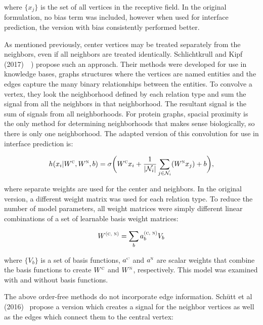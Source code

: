 \noindent
where $\{x_j\}$ is the set of all vertices in the receptive field.
In the original formulation, no bias term was included, however when used for interface prediction, the version with bias consistently performed better.

As mentioned previously, center vertices may be treated separately from the neighbors, even if all neighbors are treated identically. 
Schlichtkrull and Kipf (2017)~~\cite{schlichtkrull2017}) propose such an approach.
Their methods were developed for use in knowledge bases, graphs structures where the vertices are named entities and the edges capture the many binary relationships between the entities. 
To convolve a vertex, they look the neighborhood defined by each relation type and sum the signal from all the neighbors in that neighborhood.
The resultant signal is the sum of signals from all neighborhoods.
For protein graphs, spacial proximity is the only method for determining neighborhoods that makes sense biologically, so there is only one neighborhood.
The adapted version of this convolution for use in interface prediction is:

\begin{equation}
h(x_i | W^\textsc{c}, W^\textsc{n}, b)= \sigma \bigg( W^\textsc{c} x_i + \frac{1}{|\mathcal{N}_i|} \sum_{j \in \mathcal{N}_i}(W^\textsc{n} x_j)  + b\bigg),
\label{eq:rgcn}
\end{equation}

\noindent
where separate weights are used for the center and neighbors. 
In the original version, a different weight matrix was used for each relation type.  
To reduce the number of model parameters, all weight matrices were simply different linear combinations of a set of learnable basis weight matrices:

\begin{equation}
W^\textsc{(c, n)} = \sum_{b} a^\textsc{(c, n)}_b V_b 
\label{eq:rgcn_basis}
\end{equation}

\noindent
where $\{V_b\}$ is a set of basis functions, $a^\textsc{c}$ and $a^\textsc{n}$ are scalar weights that combine the basis functions to create $W^\textsc{c}$ and $W^\textsc{n}$, respectively.
This model was examined with and without basis functions.

The above order-free methods do not incorporate edge information.
Sch{\"u}tt et al (2016)~\cite{schutt2017} propose a version which creates a signal for the neighbor vertices as well as the edges which connect them to the central vertex:

